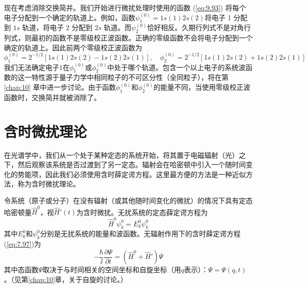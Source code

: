     现在考虑消除交换简并。我们开始进行微扰处理时使用的函数 (\ref{eq:9.93}) 将每个电子分配到一个确定的轨道上。例如，函数$\psi_1^{\left(0\right)} = 1s\left(1\right)2s\left(2\right)$将电子 1 分配到 $1s$ 轨道，将电子 2 分配到 $2s$ 轨道。而$\psi_2^{\left(0\right)}$恰好相反。久期行列式不是对角行列式，则最初的函数不是零级校正波函数。正确的零级函数不会将电子分配到一个确定的轨道上。因此前两个零级校正波函数为
    \begin{equation*}
        \phi_1^{\left(0\right)} = 2^{-1/2} \left[ 1s(1)2s(2) - 1s(2)2s(1) \right], \quad \phi_2^{\left(0\right)} = 2^{-1/2} \left[ 1s(1)2s(2) + 1s(2)2s(1) \right]
    \end{equation*}
    我们无法确定电子1在$\phi_1^{\left(0\right)}$或$\phi_2^{\left(0\right)}$中处于哪个轨道。包含一个以上电子的系统波函数的这一特性源于量子力学中相同粒子的不可区分性（全同粒子），将在第 \ref{chap:10} 章中进一步讨论。由于函数$\phi_1^{\left(0\right)}$和$\phi_2^{\left(0\right)}$的能量不同，当使用零级校正波函数时，交换简并就被消除了。

\section{含时微扰理论}
\label{sec:9.8 Time-dependent Perturbation Theory}

    在光谱学中，我们从一个处于某种定态的系统开始，将其置于电磁辐射（光）之下，然后观察该系统是否过渡到了另一定态。辐射会在哈密顿中引入一个随时间变化的势能项，因此我们必须使用含时薛定谔方程。这里最方便的方法是一种近似方法，称为含时微扰理论。

    令系统（原子或分子）在没有辐射（或其他随时间变化的微扰）的情况下具有定态哈密顿量$\hat{H}^0$，视$\hat{H}'\left(t\right)$为含时微扰。无扰系统的定态薛定谔方程为
    \begin{equation}
        \hat{H}^0 \psi_k^0 = E_k^0 \psi_k^0
        \label{eq:9.112}
    \end{equation}
    其中$E_k^0$和$\psi_k^0$分别是无扰系统的能量和波函数。无辐射作用下的含时薛定谔方程(\ref{eq:7.97})为
    \begin{equation}
        -\frac{\hbar}{\ii }\frac{\partial \Psi}{\partial t} = \left(\hat{H}^0 + \hat{H}'\right) \Psi
        \label{eq:9.113}
    \end{equation}
    其中态函数$\Psi$取决于与时间相关的空间坐标和自旋坐标（用$q$表示）：$\Psi = \Psi\left(q,t\right)$。（见第\ref{chap:10}章，关于自旋的讨论。）

